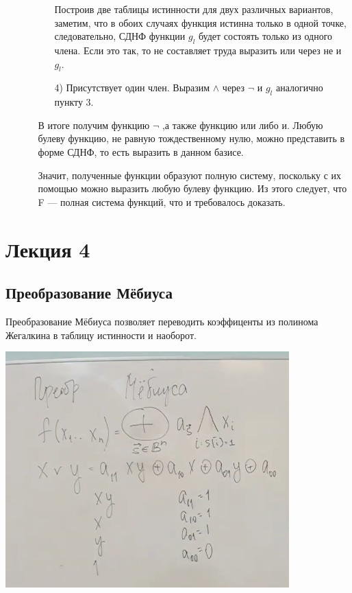 \documentclass{article}
\begin{document}
\begin{enumerate}
\begin{enumerate}
\begin{enumerate}
    Построив две таблицы истинности для двух различных вариантов, заметим, что в обоих случаях функция истинна только в одной точке, следовательно, СДНФ функции $g_l$
 будет состоять только из одного члена. Если это так, то не составляет труда выразить или через не
 и $g_l$.
    \item[4)] Присутствует один член.
     Выразим $\wedge$ через $\neg$ и $g_l$ аналогично пункту 3.
\end{enumerate}

В итоге получим функцию $\neg$ ,а также функцию или либо и. Любую булеву функцию, не равную тождественному нулю, можно представить в форме СДНФ, то есть выразить в данном базисе.

Значит, полученные функции образуют полную систему, поскольку с их помощью можно выразить любую булеву функцию. Из этого следует, что F — полная система функций, что и требовалось доказать.

\end{enumerate}
\end{enumerate}

\section{Лекция 4}

\subsection{Преобразование Мёбиуса}
Преобразование Мёбиуса позволяет переводить коэффиценты из полинома Жегалкина в таблицу истинности и наоборот. 

\begin{center}
  \includegraphics[height=9.1cm]{Mebius.png}
\end{center}
  
\end{document}
